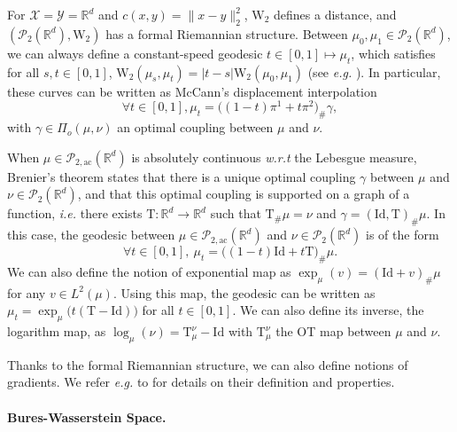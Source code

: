 \documentclass[twoside]{article}
\newcommand{\cP}{\mathcal{P}}
\newcommand{\cPa}{\mathcal{P}_{2,\mathrm{ac}}(\R^d)}
\newcommand{\cX}{\mathcal{X}}
\newcommand{\cY}{\mathcal{Y}}
\newcommand{\W}{\mathrm{W}}
\newcommand{\R}{\mathbb{R}}
\newcommand{\T}{\mathrm{T}}
\newcommand{\id}{\mathrm{Id}}
\begin{document}
For $\cX=\cY=\R^d$ and $c(x,y)=\|x-y\|_2^2$, $\W_2$ defines a distance, and $(\cP_2(\R^d),\W_2)$ has a formal Riemannian structure. Between $\mu_0,\mu_1\in\cP_2(\R^d)$, we can always define a constant-speed geodesic $t\in[0,1]\mapsto \mu_t$, which satisfies for all $s,t\in [0,1]$, $\W_2(\mu_s,\mu_t)=|t-s|\W_2(\mu_0,\mu_1)$ (see \emph{e.g.} \citep[Theorem 5.27]{santambrogio2015optimal}). In particular, these curves can be written as McCann's displacement interpolation \citep{mccann1997convexity}
\begin{equation}
    \forall t\in [0,1], \mu_t = \big((1-t)\pi^1 + t\pi^2)_\#\gamma,
\end{equation}
with $\gamma\in\Pi_o(\mu,\nu)$ an optimal coupling between $\mu$ and $\nu$.

When $\mu\in\cPa$ is absolutely continuous \emph{w.r.t} the Lebesgue measure, Brenier's theorem \citep{brenier1991polar} states that there is a unique optimal coupling $\gamma$ between $\mu$ and $\nu\in\cP_2(\R^d)$, and that this optimal coupling is supported on a graph of a function, \emph{i.e.} there exists $\T:\R^d\to\R^d$ such that $\T_\#\mu=\nu$ and $\gamma=(\id,\T)_\#\mu$. In this case, the geodesic between $\mu\in\cPa$ and $\nu\in\cP_2(\R^d)$ is of the form
\begin{equation}
    \forall t\in [0,1],\ \mu_t = \big((1-t)\id + t \T)_\#\mu.
\end{equation}
We can also define the notion of exponential map as $\exp_\mu(v) = (\id + v)_\#\mu$ for any $v\in L^2(\mu)$. Using this map, the geodesic can be written as $\mu_t = \exp_\mu\big(t(\T-\id)\big)$ for all $t\in [0,1]$. We can also define its inverse, the logarithm map, as $\log_\mu(\nu)=\T_\mu^\nu-\id$ with $\T_\mu^\nu$ the OT map between $\mu$ and $\nu$.

Thanks to the formal Riemannian structure, we can also define notions of gradients. We refer \emph{e.g.} to \citep{ambrosio2008gradient} for details on their definition and properties.


\paragraph{Bures-Wasserstein Space.}
\end{document}
